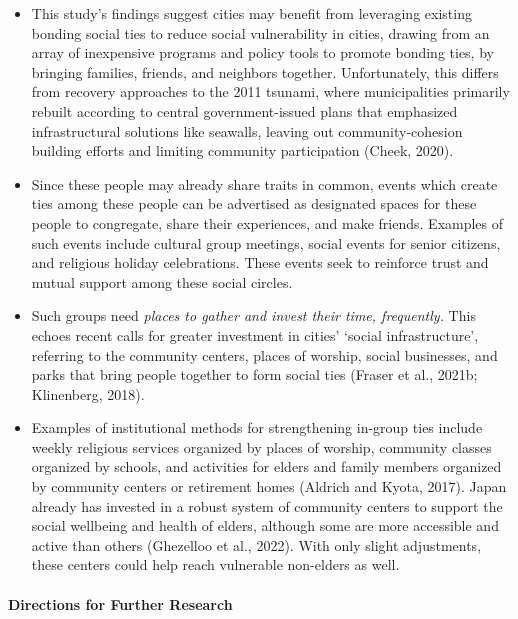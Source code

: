 \documentclass[]{elsarticle} %
\begin{document}
\begin{itemize}
\item
  This study's findings suggest cities may benefit from leveraging
  existing bonding social ties to reduce social vulnerability in cities,
  drawing from an array of inexpensive programs and policy tools to
  promote bonding ties, by bringing families, friends, and neighbors
  together. Unfortunately, this differs from recovery approaches to the
  2011 tsunami, where municipalities primarily rebuilt according to
  central government-issued plans that emphasized infrastructural
  solutions like seawalls, leaving out community-cohesion building
  efforts and limiting community participation (Cheek, 2020).
\item
  Since these people may already share traits in common, events which
  create ties among these people can be advertised as designated spaces
  for these people to congregate, share their experiences, and make
  friends. Examples of such events include cultural group meetings,
  social events for senior citizens, and religious holiday celebrations.
  These events seek to reinforce trust and mutual support among these
  social circles.
\item
  Such groups need \emph{places to gather and invest their time,
  frequently.} This echoes recent calls for greater investment in
  cities' `social infrastructure', referring to the community centers,
  places of worship, social businesses, and parks that bring people
  together to form social ties (Fraser et al., 2021b; Klinenberg, 2018).
\item
  Examples of institutional methods for strengthening in-group ties
  include weekly religious services organized by places of worship,
  community classes organized by schools, and activities for elders and
  family members organized by community centers or retirement homes
  (Aldrich and Kyota, 2017). Japan already has invested in a robust
  system of community centers to support the social wellbeing and health
  of elders, although some are more accessible and active than others
  (Ghezelloo et al., 2022). With only slight adjustments, these centers
  could help reach vulnerable non-elders as well.
\end{itemize}

\hypertarget{directions-for-further-research}{%
\paragraph{Directions for Further
Research}\label{directions-for-further-research}}
\end{document}
